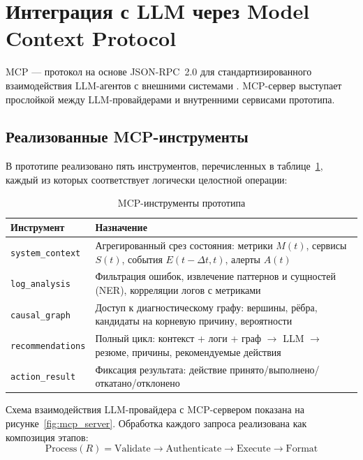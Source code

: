 \section{Интеграция с LLM через Model Context Protocol}
\label{sec:mcp}

MCP --- протокол на основе JSON-RPC~2.0 для стандартизированного взаимодействия LLM-агентов с внешними системами \cite{mcp_specification}. MCP-сервер выступает прослойкой между LLM-провайдерами и внутренними сервисами прототипа.

\subsection{Реализованные MCP-инструменты}

В прототипе реализовано пять инструментов, перечисленных в таблице~\ref{tab:mcp_tools}, каждый из которых соответствует логически целостной операции:

\begin{table}[H]
\centering
\small
\caption{MCP-инструменты прототипа}
\label{tab:mcp_tools}
\begin{tabular}{|p{4cm}|p{7.5cm}|}
\hline
\textbf{Инструмент} & \textbf{Назначение} \\
\hline
\texttt{system\_context} & Агрегированный срез состояния: метрики $M(t)$, сервисы $S(t)$, события $E(t-\Delta t, t)$, алерты $A(t)$ \\
\hline
\texttt{log\_analysis} & Фильтрация ошибок, извлечение паттернов и сущностей (NER), корреляции логов с метриками \\
\hline
\texttt{causal\_graph} & Доступ к диагностическому графу: вершины, рёбра, кандидаты на корневую причину, вероятности \\
\hline
\texttt{recommendations} & Полный цикл: контекст + логи + граф $\to$ LLM $\to$ \linebreak резюме, причины, рекомендуемые действия \\
\hline
\texttt{action\_result} & Фиксация результата: действие принято/выполнено/откатано/отклонено \\
\hline
\end{tabular}
\end{table}

Схема взаимодействия LLM-провайдера с MCP-сервером показана на рисунке~\ref{fig:mcp_server}. Обработка каждого запроса реализована как композиция этапов:
\begin{equation}
\text{Process}(R) = \text{Validate} \to \text{Authenticate} \to \text{Execute} \to \text{Format}
\label{eq:mcp_processing}
\end{equation}

